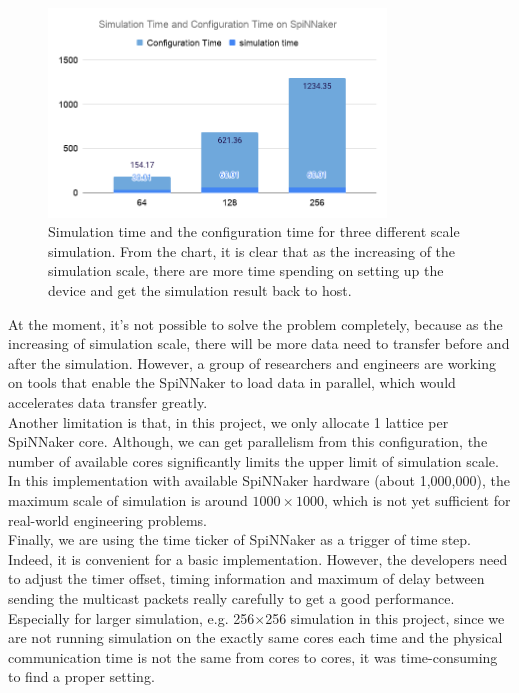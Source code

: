 \begin{figure}[tb]
   \centering
       \includegraphics[width=0.8\textwidth]{figures/Simulation Time and Configuration Time on SpiNNaker.png}
       \caption{Simulation time and the configuration time for three different scale simulation. From the chart, it is clear that as the increasing of the simulation scale, there are more time spending on setting up the device and get the simulation result back to host.}
       \label{fig:loading}
\end{figure}

At the moment, it's not possible to solve the problem completely, because as the increasing of simulation scale, there will be more data need to transfer before and after the simulation. However, a group of researchers and engineers are working on tools that enable the SpiNNaker to load data in parallel, which would accelerates data transfer greatly.\\

Another limitation is that, in this project, we only allocate 1 lattice per SpiNNaker core. Although, we can get parallelism from this configuration, the number of available cores significantly limits the upper limit of simulation scale. In this implementation with available SpiNNaker hardware (about 1,000,000), the maximum scale of simulation is around  $1000 \times 1000$, which is not yet sufficient for real-world engineering problems.\\

Finally, we are using the time ticker of SpiNNaker as a trigger of time step. Indeed, it is convenient for a basic implementation. However, the developers need to adjust the timer offset, timing information and maximum of delay between sending the multicast packets really carefully to get a good performance. Especially for larger simulation, e.g. 256$\times$256 simulation in this project, since we are not running simulation on the exactly same cores each time and the physical communication time is not the same from cores to cores, it was time-consuming to find a proper setting.\\

